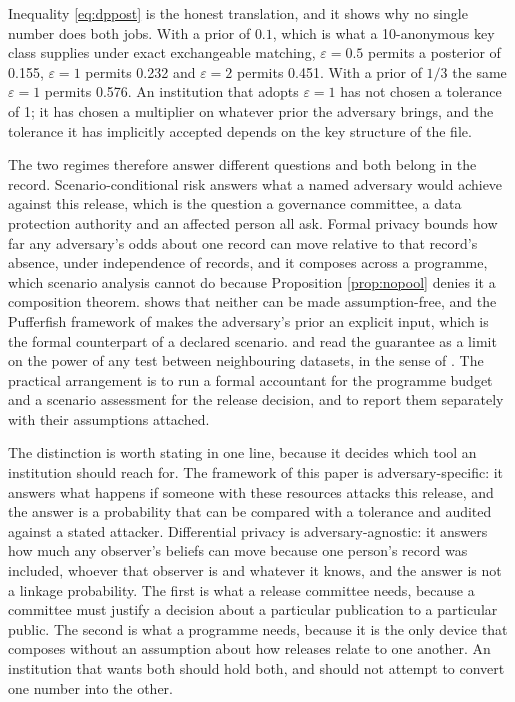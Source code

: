 \documentclass[11pt,a4paper]{article}
\theoremstyle{plain}
\theoremstyle{definition}
\begin{document}
Inequality \eqref{eq:dppost} is the honest translation, and it shows why no
single number does both jobs. With a prior of $0.1$, which is what a 10-anonymous
key class supplies under exact exchangeable matching, $\varepsilon = 0.5$
permits a posterior of 0.155, $\varepsilon = 1$ permits 0.232 and
$\varepsilon = 2$ permits 0.451. With a prior of $1/3$ the same
$\varepsilon = 1$ permits 0.576. An institution that adopts $\varepsilon = 1$
has not chosen a tolerance of 1; it has chosen a multiplier on whatever prior
the adversary brings, and the tolerance it has implicitly accepted depends on
the key structure of the file.

The two regimes therefore answer different questions and both belong in the
record. Scenario-conditional risk answers what a named adversary would achieve
against this release, which is the question a governance committee, a data
protection authority and an affected person all ask. Formal privacy bounds how far
any adversary's odds about one record can move relative to that record's
absence, under independence of records, and it composes across a programme,
which scenario analysis cannot do because Proposition \ref{prop:nopool} denies
it a composition theorem. \citet{kifer2011} shows that
neither can be made assumption-free, and the Pufferfish framework of
\citet{kifer2014} makes the adversary's prior an explicit input, which is the
formal counterpart of a declared scenario. \citet{kairouz2017} and
\citet{balle2020} read the guarantee as a limit on the power of any test between
neighbouring datasets, in the sense of \citet{neyman1933}. The practical arrangement is to run a
formal accountant for the programme budget and a scenario assessment for the
release decision, and to report them separately with their assumptions attached.

The distinction is worth stating in one line, because it decides which tool an
institution should reach for. The framework of this paper is
adversary-specific: it answers what happens if someone with these resources
attacks this release, and the answer is a probability that can be compared with a
tolerance and audited against a stated attacker. Differential privacy is
adversary-agnostic: it answers how much any observer's beliefs can move because
one person's record was included, whoever that observer is and whatever it knows,
and the answer is not a linkage probability. The first is what a release committee
needs, because a committee must justify a decision about a particular publication
to a particular public. The second is what a programme needs, because it is the
only device that composes without an assumption about how releases relate to one
another. An institution that wants both should hold both, and should not attempt
to convert one number into the other.
\end{document}
